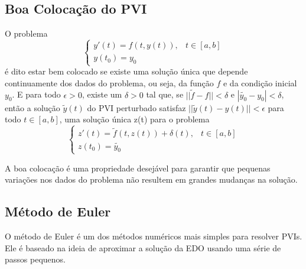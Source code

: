\subsection{Boa Colocação do PVI}
O problema 
\begin{equation}
    \begin{cases}
        y'(t) = f(t, y(t)), & t \in [a, b] \\
        y(t_0) = y_0
    \end{cases}
\end{equation}
é dito estar bem colocado se existe uma solução única que depende continuamente dos dados do problema, ou seja, da função $f$ e da condição inicial $y_0$. 
E para todo $\epsilon > 0$, existe um $\delta > 0$ tal que, se $||\tilde{f} - f|| < \delta$ e $|\tilde{y_0} - y_0| < \delta$, então a solução $\tilde{y}(t)$ do PVI perturbado satisfaz $||\tilde{y}(t) - y(t)|| < \epsilon$ para todo $t \in [a, b]$, uma solução única z(t) para o problema 
\begin{equation}
    \begin{cases}
        z'(t) = \tilde{f}(t, z(t)) + \delta(t) , & t \in [a, b] \\
        z(t_0) = \tilde{y_0}
    \end{cases}
\end{equation}

A boa colocação é uma propriedade desejável para garantir que pequenas variações nos dados do problema não resultem em grandes mudanças na solução.


\subsection{Método de Euler}
O método de Euler é um dos métodos numéricos mais simples para resolver PVIs. Ele é baseado na ideia de aproximar a solução da EDO usando uma série de passos pequenos.

